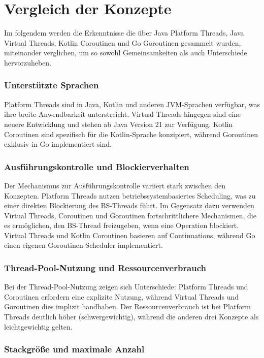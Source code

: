 \documentclass[fontsize=12pt,paper=a4,twoside=semi,parskip=half-,headsepline,headinclude]{scrreprt}
\begin{document}
\section{Vergleich der Konzepte}

Im folgendem werden die Erkenntnisse die über Java Platform Threads, Java Virtual Threads, Kotlin Coroutinen und Go Goroutinen gesammelt wurden, miteinander verglichen, um so sowohl Gemeinsamkeiten als auch Unterschiede hervorzuheben.

\subsubsection{Unterstützte Sprachen}

Platform Threads sind in Java, Kotlin und anderen JVM-Sprachen verfügbar, was ihre breite Anwendbarkeit unterstreicht. Virtual Threads hingegen sind eine neuere Entwicklung und stehen ab Java Version 21 zur Verfügung. Kotlin Coroutinen sind spezifisch für die Kotlin-Sprache konzipiert, während Goroutinen exklusiv in Go implementiert sind.

\subsubsection{Ausführungskontrolle und Blockierverhalten}

Der Mechanismus zur Ausführungskontrolle variiert stark zwischen den Konzepten. Platform Threads nutzen betriebssystembasiertes Scheduling, was zu einer direkten Blockierung des BS-Threads führt. Im Gegensatz dazu verwenden Virtual Threads, Coroutinen und Goroutinen fortschrittlichere Mechanismen, die es ermöglichen, den BS-Thread freizugeben, wenn eine Operation blockiert. Virtual Threads und Kotlin Coroutinen basieren auf Continuations, während Go einen eigenen Goroutinen-Scheduler implementiert.

\subsubsection{Thread-Pool-Nutzung und Ressourcenverbrauch}

Bei der Thread-Pool-Nutzung zeigen sich Unterschiede: Platform Threads und Coroutinen erfordern eine explizite Nutzung, während Virtual Threads und Goroutinen dies implizit handhaben. Der Ressourcenverbrauch ist bei Platform Threads deutlich höher (schwergewichtig), während die anderen drei Konzepte als leichtgewichtig gelten.

\subsubsection{Stackgröße und maximale Anzahl}
\end{document}
